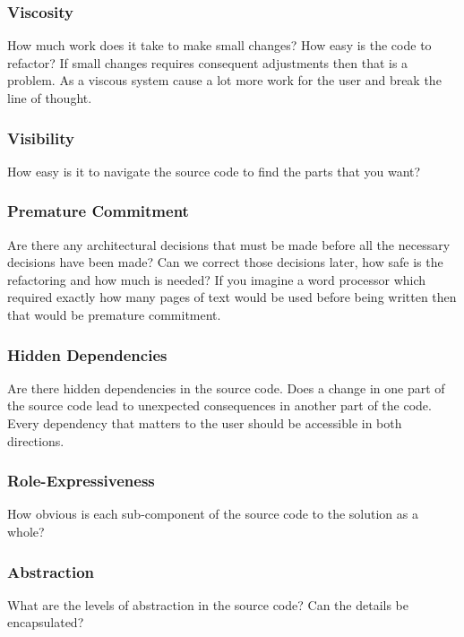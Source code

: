 \documentclass[12pt]{article}
\theoremstyle{definition}
\theoremstyle{theorem}
\begin{document}
\subsubsection{Viscosity}

How much work does it take to make small changes? How easy is the code to
refactor? If small changes requires consequent adjustments then that is a
problem. As a viscous system cause a lot more work for the user and break the
line of thought.

\subsubsection{Visibility}

How easy is it to navigate the source code to find the parts that you want?

\subsubsection{Premature Commitment}

Are there any architectural decisions that must be made before all the necessary
decisions have been made? Can we correct those decisions later, how safe is the
refactoring and how much is needed? If you imagine a word processor which
required exactly how many pages of text would be used before being written then
that would be premature commitment.

\subsubsection{Hidden Dependencies}

Are there hidden dependencies in the source code. Does a change in one part of
the source code lead to unexpected consequences in another part of the code.
Every dependency that matters to the user should be accessible in both
directions. 

\subsubsection{Role-Expressiveness}

How obvious is each sub-component of the source code to the solution as a whole?

\subsubsection{Abstraction}

What are the levels of abstraction in the source code? Can the details be
encapsulated?
\end{document}
